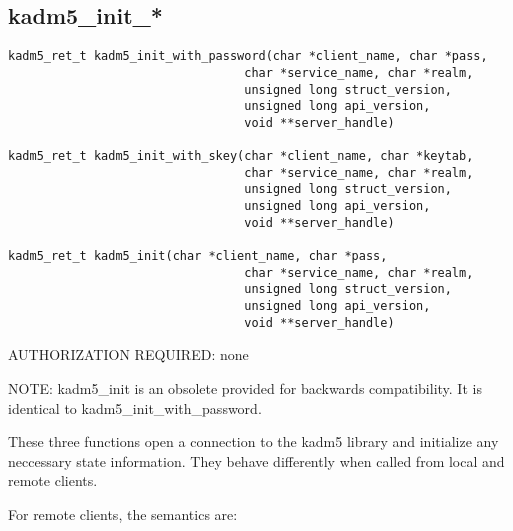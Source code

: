 \subsection{kadm5_init_*}

\begin{verbatim}
kadm5_ret_t kadm5_init_with_password(char *client_name, char *pass,
                                 char *service_name, char *realm,
                                 unsigned long struct_version,
                                 unsigned long api_version,
                                 void **server_handle)

kadm5_ret_t kadm5_init_with_skey(char *client_name, char *keytab,
                                 char *service_name, char *realm,
                                 unsigned long struct_version,
                                 unsigned long api_version,
                                 void **server_handle)

kadm5_ret_t kadm5_init(char *client_name, char *pass,
                                 char *service_name, char *realm,
                                 unsigned long struct_version,
                                 unsigned long api_version,
                                 void **server_handle)
\end{verbatim}

AUTHORIZATION REQUIRED: none

NOTE: kadm5_init is an obsolete provided for backwards
compatibility.  It is identical to kadm5_init_with_password.

These three functions open a connection to the kadm5 library and
initialize any neccessary state information.  They behave differently
when called from local and remote clients.  

For remote clients, the semantics are:


